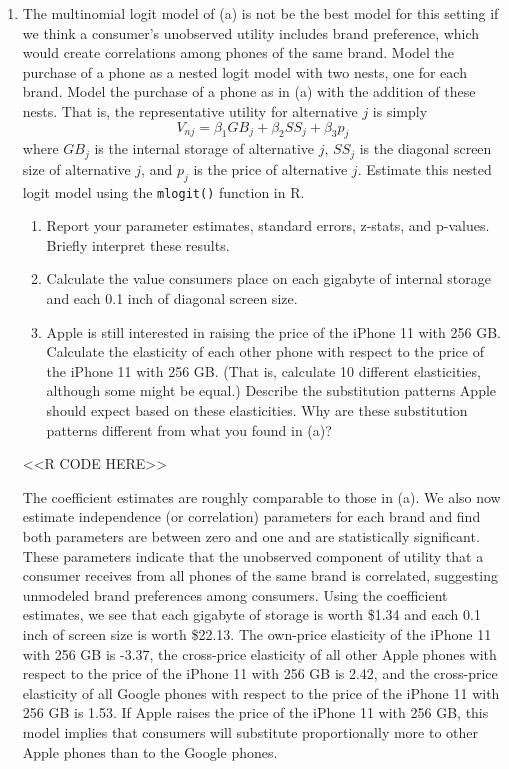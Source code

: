 \documentclass[11pt,letterpaper]{article}
\begin{document}
\begin{enumerate}[label=\alph*., leftmargin=*]
	\item The multinomial logit model of (a) is not be the best model for this setting if we think a consumer's unobserved utility includes brand preference, which would create correlations among phones of the same brand. Model the purchase of a phone as a nested logit model with two nests, one for each brand. Model the purchase of a phone as in (a) with the addition of these nests. That is, the representative utility for alternative $j$ is simply
	$$V_{nj} = \beta_1 GB_j + \beta_2 SS_j + \beta_3 p_j$$
	where $GB_j$ is the internal storage of alternative $j$, $SS_j$ is the diagonal screen size of alternative $j$, and $p_j$ is the price of alternative $j$. Estimate this nested logit model using the \texttt{mlogit()} function in R. 
	\begin{enumerate}[label=\roman*.]
		\item Report your parameter estimates, standard errors, z-stats, and p-values. Briefly interpret these results. 
		\item Calculate the value consumers place on each gigabyte of internal storage and each 0.1 inch of diagonal screen size.
		\item Apple is still interested in raising the price of the iPhone 11 with 256 GB. Calculate the elasticity of each other phone with respect to the price of the iPhone 11 with 256 GB. (That is, calculate 10 different elasticities, although some might be equal.) Describe the substitution patterns Apple should expect based on these elasticities. Why are these substitution patterns different from what you found in (a)?
	\end{enumerate}

	<<R CODE HERE>>

	The coefficient estimates are roughly comparable to those in (a). We also now estimate independence (or correlation) parameters for each brand and find both parameters are between zero and one and are statistically significant. These parameters indicate that the unobserved component of utility that a consumer receives from all phones of the same brand is correlated, suggesting unmodeled brand preferences among consumers. Using the coefficient estimates, we see that each gigabyte of storage is worth \$1.34 and each 0.1 inch of screen size is worth \$22.13. The own-price elasticity of the iPhone 11 with 256 GB is -3.37, the cross-price elasticity of all other Apple phones with respect to the price of the iPhone 11 with 256 GB is 2.42, and the cross-price elasticity of all Google phones with respect to the price of the iPhone 11 with 256 GB is 1.53. If Apple raises the price of the iPhone 11 with 256 GB, this model implies that consumers will substitute proportionally more to other Apple phones than to the Google phones.


\end{enumerate}
\end{document}
